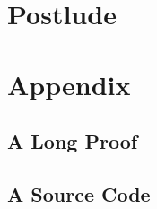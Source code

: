 \documentclass[12pt]{report}
\theoremstyle{definition}
\theoremstyle{remark}
\numberwithin{definition}{section}
\numberwithin{equation}{section}
\numberwithin{proposition}{section}
\numberwithin{conjecture}{section}
\numberwithin{theorem}{section}
\numberwithin{lemma}{section}
\numberwithin{corollary}{section}
\numberwithin{example}{section}
\numberwithin{remark}{section}
\begin{document}
\part{Postlude}\label{part:Postlude}




\appendix
\part{Appendix}
\chapter{A Long Proof}
\chapter{A Source Code}
\end{document}
